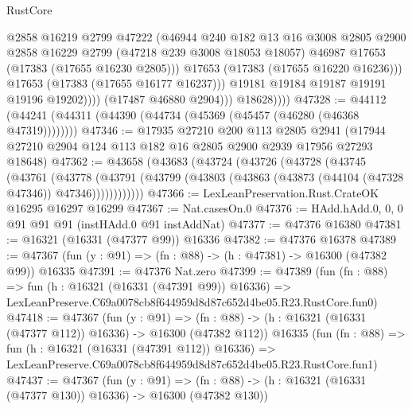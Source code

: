 \begin{lexlean}{RustCore}
\begin{coremodule}
                            @2858
                            @16219
                            @2799
                            @47222
                            (@46944
                              @240
                              @182
                              @13
                              @16
                              @3008
                              @2805
                              @2900
                              @2858
                              @16229
                              @2799
                              (@47218 @239 @3008 @18053 @18057)
                              @46987
                              @17653
                              (@17383 (@17655 @16230 @2805)))
                            @17653
                            (@17383 (@17655 @16220 @16236)))
                          @17653
                          (@17383 (@17655 @16177 @16237)))
                        @19181
                        @19184
                        @19187
                        @19191
                        @19196
                        @19202))))
                (@17487 @46880 @2904)))
            @18628))))
@47328 := @44112 (@44241 (@44311 (@44390 (@44734 (@45369 (@45457 (@46280 (@46368 @47319))))))))
@47346 := @17935
    @27210
    @200
    @113
    @2805
    @2941
    (@17944 @27210 @2904 @124 @113 @182 @16 @2805 @2900 @2939 @17956 @27293 @18648)
@47362 := @43658
    (@43683
      (@43724
        (@43726
          (@43728
            (@43745
              (@43761
                (@43778
                  (@43791
                    (@43799 (@43803 (@43863 (@43873 (@44104 (@47328 @47346)) @47346))))))))))))
@47366 := LexLeanPreservation.Rust.CrateOK @16295 @16297 @16299
@47367 := Nat.casesOn.{0}
@47376 := HAdd.hAdd.{0, 0, 0} @91 @91 @91 (instHAdd.{0} @91 instAddNat)
@47377 := @47376 @16380
@47381 := @16321 (@16331 (@47377 @99)) @16336
@47382 := @47376 @16378
@47389 := @47367 (fun (y : @91) => (fn : @88) -> (h : @47381) -> @16300 (@47382 @99)) @16335
@47391 := @47376 Nat.zero
@47399 := @47389
    (fun (fn : @88) =>
    fun (h : @16321 (@16331 (@47391 @99)) @16336) =>
    LexLeanPreserve.C69a0078cb8f644959d8d87c652d4be05.R23.RustCore.fun0)
@47418 := @47367
    (fun (y : @91) =>
    (fn : @88) -> (h : @16321 (@16331 (@47377 @112)) @16336) -> @16300 (@47382 @112))
    @16335
    (fun (fn : @88) =>
    fun (h : @16321 (@16331 (@47391 @112)) @16336) =>
    LexLeanPreserve.C69a0078cb8f644959d8d87c652d4be05.R23.RustCore.fun1)
@47437 := @47367
    (fun (y : @91) =>
    (fn : @88) -> (h : @16321 (@16331 (@47377 @130)) @16336) -> @16300 (@47382 @130))

\end{coremodule}
\end{lexlean}
